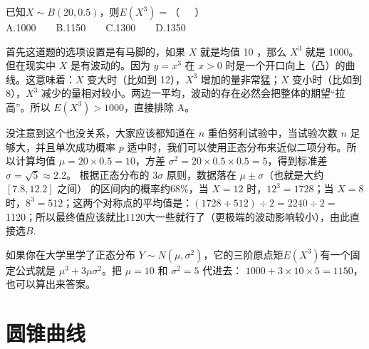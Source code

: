 \documentclass[lang=cn,11pt]{elegantbook}
\begin{document}
\newpage
\begin{exercise}
已知$X\sim B(20,0.5)$，则$E(X^3)=$（~~~）\\
A.1000~~~~B.1150~~~~C.1300~~~~D.1350
\end{exercise}
\begin{solution}
首先这道题的选项设置是有马脚的，如果 $X$ 就是均值 10 ，那么 $X^3$ 就是 1000。但在现实中 $X$ 是有波动的。因为 $y=x^3$ 在 $x>0$ 时是一个开口向上（凸）的曲线。这意味着：$X$ 变大时（比如到 12），$X^3$ 增加的量非常猛；$X$ 变小时（比如到 8），$X^3$ 减少的量相对较小。两边一平均，波动的存在必然会把整体的期望“拉高”。所以 $E(X^3) > 1000$，直接排除 A。

没注意到这个也没关系，大家应该都知道在 $n$ 重伯努利试验中，当试验次数 $n$ 足够大，并且单次成功概率 $p$ 适中时，我们可以使用正态分布来近似二项分布。所以计算均值 $\mu = 20 \times 0.5 = 10$，方差 $\sigma^2 = 20 \times 0.5 \times 0.5 = 5$，得到标准差 $\sigma = \sqrt{5} \approx 2.2$。
根据正态分布的 $3\sigma$ 原则，数据落在 $\mu \pm \sigma$（也就是大约 $[7.8, 12.2]$ 之间） 的区间内的概率约68\%，当 $X = 12$ 时，$12^3 = 1728$；当 $X = 8$ 时，$8^3 = 512$；这两个对称点的平均值是：$(1728 + 512) \div 2 = 2240 \div 2 =$ 1120；所以最终值应该就比$1120$大一些就行了（更极端的波动影响较小），由此直接选$B$.
\begin{note}
如果你在大学里学了正态分布 $Y \sim N(\mu, \sigma^2)$，它的三阶原点矩$E(X^3)$有一个固定公式就是 $\mu^3 + 3\mu\sigma^2$。把 $\mu=10$ 和 $\sigma^2=5$ 代进去：
$1000 + 3 \times 10 \times 5 = 1150$，也可以算出来答案。
\end{note}
\end{solution}







\chapter{圆锥曲线}
\end{document}
